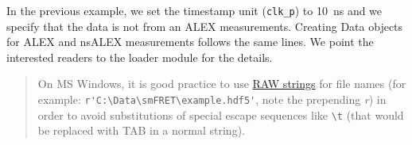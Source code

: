 In the previous example, we set the timestamp unit (\verb|clk_p|) to 10~ns and we specify that the data is not from an ALEX measurements. Creating Data objects for ALEX and nsALEX measurements follows the same lines. We point the interested readers to the loader module for the details.

\begin{quote}
On MS Windows, it is good practice to use \href{https://docs.python.org/2/tutorial/introduction.html#strings}{RAW strings} for file names (for example: \verb|r'C:\Data\smFRET\example.hdf5'|, note the prepending \textit{r}) in order to avoid substitutions of special escape sequences like \verb|\t| (that would be replaced with TAB in a normal string).
\end{quote}